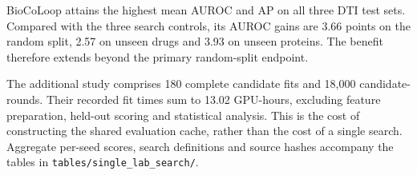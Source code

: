 

BioCoLoop attains the highest mean AUROC and AP on all three DTI test sets. Compared with the three search controls, its AUROC gains are 3.66 points on the random split, 2.57 on unseen drugs and 3.93 on unseen proteins. The benefit therefore extends beyond the primary random-split endpoint.

The additional study comprises 180 complete candidate fits and 18,000 candidate-rounds. Their recorded fit times sum to 13.02 GPU-hours, excluding feature preparation, held-out scoring and statistical analysis. This is the cost of constructing the shared evaluation cache, rather than the cost of a single search. Aggregate per-seed scores, search definitions and source hashes accompany the tables in \texttt{tables/single\_lab\_search/}.
